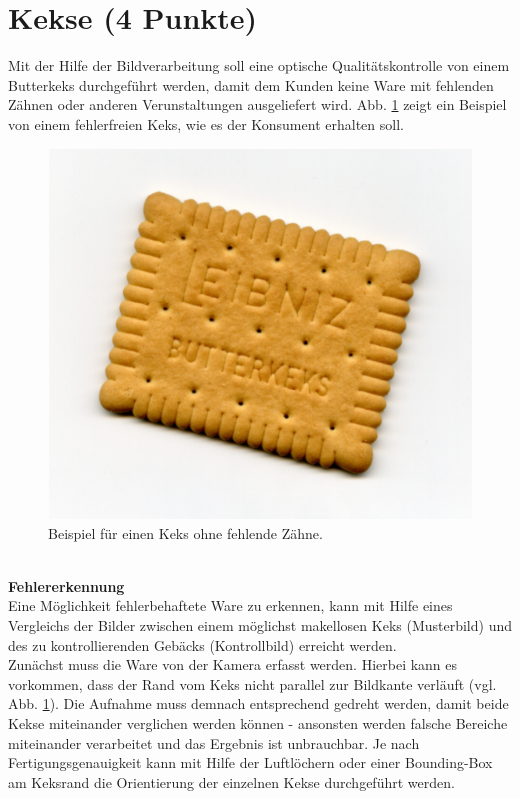 \documentclass{ezb}
\begin{document}
\section{Kekse (4 Punkte)}
Mit der Hilfe der Bildverarbeitung soll eine optische Qualitätskontrolle von einem Butterkeks durchgeführt werden, damit dem Kunden keine Ware mit fehlenden Zähnen oder anderen Verunstaltungen ausgeliefert wird. Abb. \ref{fig:keks_original} zeigt ein Beispiel von einem fehlerfreien Keks, wie es der Konsument erhalten soll.
\begin{figure}[!h]
\begin{center}
    \includegraphics[scale=0.3]{Keks_original.png}
\end{center}
    \caption{Beispiel für einen Keks ohne fehlende Zähne.}
    \label{fig:keks_original}
\end{figure}\\
\newline
\textbf{{\large Fehlererkennung}}\\
\newline
Eine Möglichkeit fehlerbehaftete Ware zu erkennen, kann mit Hilfe eines Vergleichs der Bilder zwischen einem möglichst makellosen Keks (Musterbild) und des zu kontrollierenden Gebäcks (Kontrollbild) erreicht werden.\\
\newline
Zunächst muss die Ware von der Kamera erfasst werden. Hierbei kann es vorkommen, dass der Rand vom Keks nicht parallel zur Bildkante verläuft (vgl. Abb. \ref{fig:keks_original}). Die Aufnahme muss demnach entsprechend gedreht werden, damit beide Kekse miteinander verglichen werden können - ansonsten werden falsche Bereiche miteinander verarbeitet und das Ergebnis ist unbrauchbar. Je nach Fertigungsgenauigkeit kann mit Hilfe der Luftlöchern oder einer Bounding-Box am Keksrand die Orientierung der einzelnen Kekse durchgeführt werden.\\
\end{document}
